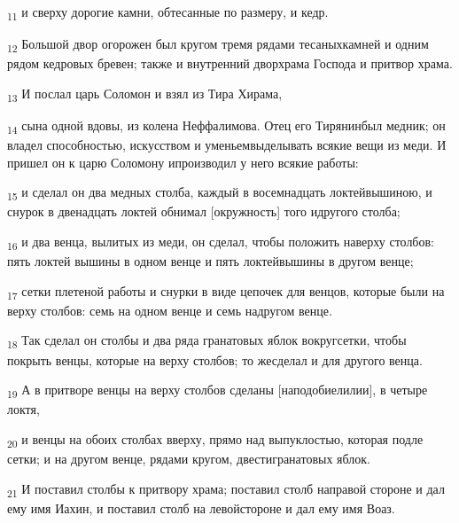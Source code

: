 \begin{tcolorbox}
\textsubscript{11} и сверху дорогие камни, обтесанные по размеру, и кедр.
\end{tcolorbox}
\begin{tcolorbox}
\textsubscript{12} Большой двор огорожен был кругом тремя рядами тесаныхкамней и одним рядом кедровых бревен; также и внутренний дворхрама Господа и притвор храма.
\end{tcolorbox}
\begin{tcolorbox}
\textsubscript{13} И послал царь Соломон и взял из Тира Хирама,
\end{tcolorbox}
\begin{tcolorbox}
\textsubscript{14} сына одной вдовы, из колена Неффалимова. Отец его Тирянинбыл медник; он владел способностью, искусством и уменьемвыделывать всякие вещи из меди. И пришел он к царю Соломону ипроизводил у него всякие работы:
\end{tcolorbox}
\begin{tcolorbox}
\textsubscript{15} и сделал он два медных столба, каждый в восемнадцать локтейвышиною, и снурок в двенадцать локтей обнимал [окружность] того идругого столба;
\end{tcolorbox}
\begin{tcolorbox}
\textsubscript{16} и два венца, вылитых из меди, он сделал, чтобы положить наверху столбов: пять локтей вышины в одном венце и пять локтейвышины в другом венце;
\end{tcolorbox}
\begin{tcolorbox}
\textsubscript{17} сетки плетеной работы и снурки в виде цепочек для венцов, которые были на верху столбов: семь на одном венце и семь надругом венце.
\end{tcolorbox}
\begin{tcolorbox}
\textsubscript{18} Так сделал он столбы и два ряда гранатовых яблок вокругсетки, чтобы покрыть венцы, которые на верху столбов; то жесделал и для другого венца.
\end{tcolorbox}
\begin{tcolorbox}
\textsubscript{19} А в притворе венцы на верху столбов сделаны [наподобиелилии], в четыре локтя,
\end{tcolorbox}
\begin{tcolorbox}
\textsubscript{20} и венцы на обоих столбах вверху, прямо над выпуклостью, которая подле сетки; и на другом венце, рядами кругом, двестигранатовых яблок.
\end{tcolorbox}
\begin{tcolorbox}
\textsubscript{21} И поставил столбы к притвору храма; поставил столб направой стороне и дал ему имя Иахин, и поставил столб на левойстороне и дал ему имя Воаз.
\end{tcolorbox}
